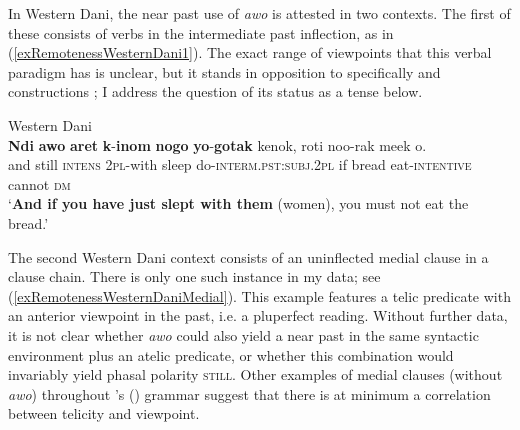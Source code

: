 In Western Dani, the near past use of \textit{awo} is attested in two contexts. The first of these consists of verbs in the intermediate past inflection, as in (\ref{exRemotenessWesternDani1}). The exact range of viewpoints that this verbal paradigm has is unclear, but it stands in opposition to specifically  and  constructions \parencite[ch. 5]{Barclay2008}; I address the question of its status as a tense below.

\begin{exe}
	\ex Western Dani \label{exRemotenessWesternDani1}\\
	\gll \textbf{Ndi} \textbf{awo} \textbf{aret} \textbf{k}-\textbf{inom} \textbf{nogo} \textbf{yo}-\textbf{gotak} kenok, roti noo-rak meek o.\\
	and still \textsc{intens} 2\textsc{pl}-with sleep do-\textsc{interm}.\textsc{pst}:\textsc{subj}.2\textsc{pl} if bread eat-\textsc{intentive} cannot \textsc{dm}\\
	\glt \lq \textbf{And if you have just slept with them} (women), you must not eat the bread.' \parencite[175]{Barclay2008}
\end{exe}

The second Western Dani  context consists of an uninflected medial clause in a clause chain. There is only one such instance in my data; see (\ref{exRemotenessWesternDaniMedial}). This example features a telic predicate with an anterior viewpoint in the past, i.e. a pluperfect reading. Without further data, it is not clear whether \textit{awo} could also yield a near past in the same syntactic environment plus an atelic predicate, or whether this combination would invariably yield phasal polarity \textsc{still}. Other examples of medial clauses (without \textit{awo}) throughout \citeauthor{Barclay2008}'s (\citeyear{Barclay2008}) grammar suggest that there is at minimum a correlation between telicity and viewpoint.

